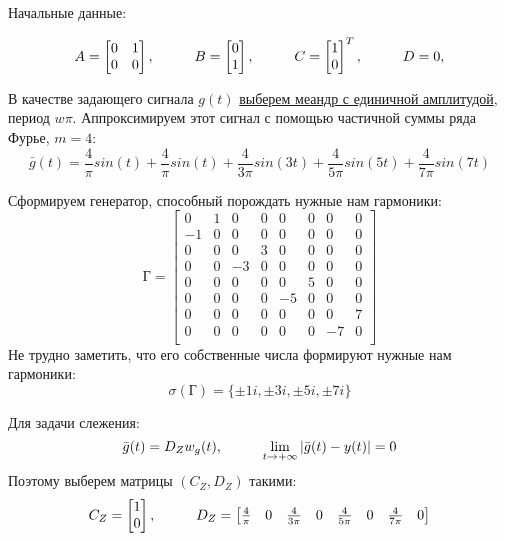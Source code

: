Начальные данные:

$$
  A = \begin{bmatrix}
    0 & 1 \\ 0 & 0
\end{bmatrix}, \hspace*{1cm} B = \begin{bmatrix}
  0 \\
  1 
\end{bmatrix}, \hspace*{1cm} C = \begin{bmatrix}
  1 \\ 0
\end{bmatrix}^T, \hspace*{1cm} D = 0, 
$$


В качестве задающего сигнала $g(t)$ \href{https://ru.wikipedia.org/wiki/%D0%9C%D0%B5%D0%B0%D0%BD%D0%B4%D1%80_(%D1%80%D0%B0%D0%B4%D0%B8%D0%BE%D1%82%D0%B5%D1%85%D0%BD%D0%B8%D0%BA%D0%B0)?useskin=vector}{выберем меандр с единичной амплитудой}, период $w\pi$. 
Аппроксимируем этот сигнал с помощью частичной суммы ряда Фурье, $m=4$:
$$
    \bar{g}(t) = \frac{4}{\pi} sin(t) + \frac{4}{\pi} sin(t) + \frac{4}{3\pi} sin(3t) + \frac{4}{5\pi} sin(5t) + \frac{4}{7\pi} sin(7t)
$$

Сформируем генератор, способный порождать нужные нам гармоники:
$$
\text{Г} = \begin{bmatrix}
    0 & 1 & 0 & 0 & 0 & 0 & 0 & 0 \\
    -1 & 0 & 0 & 0 & 0 & 0 & 0 & 0 \\
    0 & 0 & 0 & 3 & 0 & 0 & 0 & 0 \\
    0 & 0 & -3 & 0 & 0 & 0 & 0 & 0 \\
    0 & 0 & 0 & 0 & 0 & 5 & 0 & 0 \\
    0 & 0 & 0 & 0 & -5 & 0 & 0 & 0 \\
    0 & 0 & 0 & 0 & 0 & 0 & 0 & 7 \\
    0 & 0 & 0 & 0 & 0 & 0 & -7 & 0 \\
\end{bmatrix}
$$
Не трудно заметить, что его собственные числа формируют нужные нам гармоники:
$$
    \sigma(\text{Г}) = \{ \pm 1i, \pm 3i, \pm 5i, \pm 7i \}
$$

Для задачи слежения:
$$
\bar{g}(t) = D_Z w_g(t), \hspace*{1cm} \lim_{t\to +\infty} |\bar{g}(t) - y(t)| = 0
$$
Поэтому выберем матрицы $(C_Z, D_Z)$ такими:
$$
C_Z = \begin{bmatrix}
     1 \\ 0
    \end{bmatrix}, \hspace*{1cm} 
D_Z = \begin{bmatrix}
    \frac{4}{\pi} & 0 & \frac{4}{3\pi} & 0 & \frac{4}{5\pi} & 0 & \frac{4}{7\pi} & 0
\end{bmatrix}
$$

